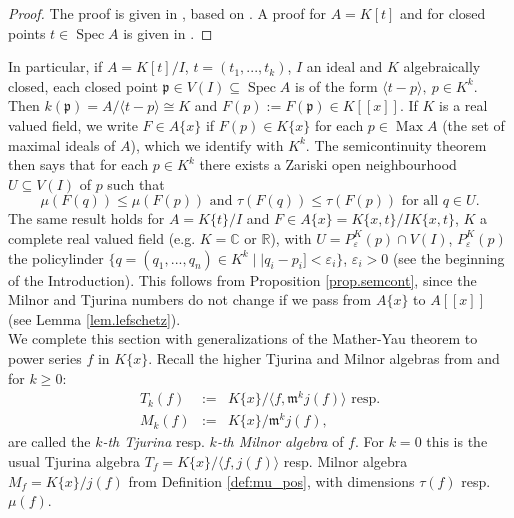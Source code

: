 \documentclass[11pt]{article}
\DeclareMathOperator{\Spec}{Spec}
\DeclareMathOperator{\Max}{Max}
\newcommand{\R}{{\mathbb R}}
\newcommand{\C}{{\mathbb C}}
\newcommand{\fp}{\mathfrak{p}}
\newcommand{\eps}{\varepsilon}
\begin{document}
\begin{proof} The proof is given in \cite[Proposition 3.2.34]{GLS25}, based on \cite[Proposition 3.1]{GP21}. A proof for $A=K[t]$ and for closed points $t\in \Spec A$ is given in \cite[Proposition 3.4]{GPh2}. 
\end {proof}

In particular, if $A=K[t]/I$, $t=(t_1,...,t_k)$, $I$ an ideal and $K$ algebraically closed, each closed point $\fp  \in V(I) \subseteq \Spec A$ is of the form $\langle t-p\rangle,\  p\in K^k$. Then $k(\fp)=A/ \langle t-p\rangle \cong K$ and $F(p):= F(\fp) \in K[[x]]$. If  $K$ is a real valued  field, we write $F \in A\{x\}$ if $F(p)\in K\{x\}$ for each $p\in \Max A$ (the set of maximal ideals of $A$), which we identify with $K^k$. The semicontinuity theorem then says that for each $p \in K^k$ there exists a Zariski open neighbourhood $U\subseteq V(I)$ of $p$ such that 
$$\mu(F(q))\leq \mu(F(p)) \text{ and } \tau(F(q))\leq \tau(F(p)) \text{ for all } q \in U.$$
 {The same result holds for  $A= K\{t\}/I$ and $F\in A\{x\} = K\{x,t\}/ I K\{x,t\}$, $K$ a complete real valued field (e.g. $K=\C$ or $\R$),} with $U=P^K_\eps(p) \cap V(I)$, $P^K_\eps(p)$ the policylinder  $\{ q=(q_1,...,q_n) \in K^k \mid |q_i-p_i]< \eps_i\}$, $\eps_i  >0$ (see the beginning of the Introduction). This follows from 
Proposition \ref{prop.semcont}, since the Milnor and Tjurina numbers do not change if we pass from $A\{x\}$ to $A[[x]]$ (see Lemma \ref{lem.lefschetz}).\\

We complete this section with  generalizations of the Mather-Yau theorem to power series $f$ in $K\{x\}$.
Recall the higher Tjurina and Milnor algebras from  {\cite{GLS25} and} \cite{GPh} for $k\ge0$:
\begin{eqnarray*}
T_k(f)&:=&K\{x\} \big/\big\langle f, \mathfrak{m}^k j(f)\big\rangle \text{ resp.} \\
M_k(f) &:=&K\{x\}/ \mathfrak{m}^k j(f),
\end{eqnarray*}
are called the \textit{$k$-th Tjurina} resp. \textit{$k$-th Milnor algebra} of $f$. For $k=0$ this is the usual Tjurina algebra $T_f=K\{x\}/\langle f, j(f) \rangle$ resp. Milnor algebra $M_f=K\{x\}/j(f)$  from Definition \ref{def:mu_pos}, with dimensions $\tau(f)$ resp. $\mu(f)$.
\end{document}
